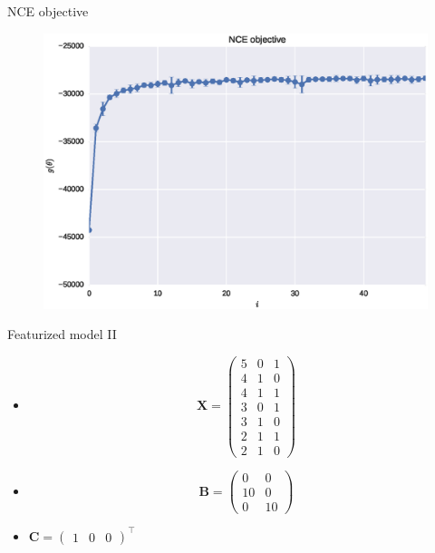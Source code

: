 \documentclass{beamer}
\begin{document}
\begin{frame}{NCE objective}
  \begin{figure}
    \centering
    \includegraphics[height=0.8\textheight]{synthetic_3_objective}
  \end{figure}
\end{frame}

\begin{frame}{Featurized model II}
  \begin{itemize}
    \item \begin{equation*}
      \mathbf{X} = \left( \begin{array}{ccc}
      5 & 0 & 1 \\
      4 & 1 & 0 \\
      4 & 1 & 1 \\
      3 & 0 & 1 \\
      3 & 1 & 0 \\
      2 & 1 & 1 \\
      2 & 1 & 0 \end{array} \right)
    \end{equation*}
    \item \begin{equation*}
      \mathbf{B} = \left( \begin{array}{cc}
      0 & 0 \\
      10 & 0 \\
      0 & 10 \end{array} \right)
    \end{equation*}
    \item $\mathbf{C} = \left( \begin{array}{ccc} 1 & 0 & 0 \end{array}\right)^{\intercal}$
  \end{itemize}
\end{frame}
\end{document}

